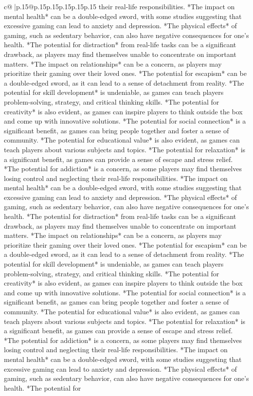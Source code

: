 \documentclass{article}
\begin{document}
{\begin{supertabular}{c@{$\;$}|p{.15\linewidth}@{}p{.15\linewidth}p{.15\linewidth}p{.15\linewidth}p{.15\linewidth}p{.15\linewidth}}
{{{their real{-}life responsibilities. *The impact on mental health* can be a double{-}edged sword, with some studies suggesting that excessive gaming can lead to anxiety and depression. *The physical effects* of gaming, such as sedentary behavior, can also have negative consequences for one's health. *The potential for distraction* from real{-}life tasks can be a significant drawback, as players may find themselves unable to concentrate on important matters. *The impact on relationships* can be a concern, as players may prioritize their gaming over their loved ones. *The potential for escapism* can be a double{-}edged sword, as it can lead to a sense of detachment from reality. *The potential for skill development* is undeniable, as games can teach players problem{-}solving, strategy, and critical thinking skills. *The potential for creativity* is also evident, as games can inspire players to think outside the box and come up with innovative solutions. *The potential for social connection* is a significant benefit, as games can bring people together and foster a sense of community. *The potential for educational value* is also evident, as games can teach players about various subjects and topics. *The potential for relaxation* is a significant benefit, as games can provide a sense of escape and stress relief. *The potential for addiction* is a concern, as some players may find themselves losing control and neglecting their real{-}life responsibilities. *The impact on mental health* can be a double{-}edged sword, with some studies suggesting that excessive gaming can lead to anxiety and depression. *The physical effects* of gaming, such as sedentary behavior, can also have negative consequences for one's health. *The potential for distraction* from real{-}life tasks can be a significant drawback, as players may find themselves unable to concentrate on important matters. *The impact on relationships* can be a concern, as players may prioritize their gaming over their loved ones. *The potential for escapism* can be a double{-}edged sword, as it can lead to a sense of detachment from reality. *The potential for skill development* is undeniable, as games can teach players problem{-}solving, strategy, and critical thinking skills. *The potential for creativity* is also evident, as games can inspire players to think outside the box and come up with innovative solutions. *The potential for social connection* is a significant benefit, as games can bring people together and foster a sense of community. *The potential for educational value* is also evident, as games can teach players about various subjects and topics. *The potential for relaxation* is a significant benefit, as games can provide a sense of escape and stress relief. *The potential for addiction* is a concern, as some players may find themselves losing control and neglecting their real{-}life responsibilities. *The impact on mental health* can be a double{-}edged sword, with some studies suggesting that excessive gaming can lead to anxiety and depression. *The physical effects* of gaming, such as sedentary behavior, can also have negative consequences for one's health. *The potential for }}}
\end{supertabular}}
\end{document}
